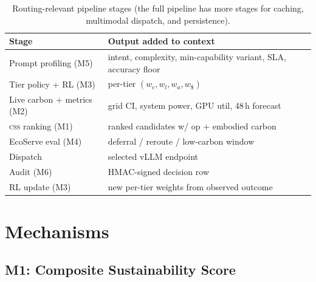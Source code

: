 \documentclass[10pt,twocolumn]{article}
\newcommand{\css}{\textsc{css}}
\begin{document}
\begin{table}[t]
  \centering
  \small
  \begin{tabular}{@{}p{}p{}@{}}
    \toprule
    \textbf{Stage} & \textbf{Output added to context} \\
    \midrule
    Prompt profiling (M5) & intent, complexity, min-capability variant, SLA, accuracy floor \\
    Tier policy + RL (M3) & per-tier $(w_c, w_l, w_a, w_{\$})$ \\
    Live carbon + metrics (M2) & grid CI, system power, GPU util, 48\,h forecast \\
    \css{} ranking (M1) & ranked candidates w/ op + embodied carbon \\
    EcoServe eval (M4) & deferral / reroute / low-carbon window \\
    Dispatch & selected vLLM endpoint \\
    Audit (M6) & HMAC-signed decision row \\
    RL update (M3) & new per-tier weights from observed outcome \\
    \bottomrule
  \end{tabular}
  \caption{Routing-relevant pipeline stages (the full pipeline has more stages
  for caching, multimodal dispatch, and persistence).}
  \label{tab:pipeline}
\end{table}

\section{Mechanisms}
\label{sec:mechanisms}

\subsection{M1: Composite Sustainability Score}
\label{sec:m1}
\end{document}
